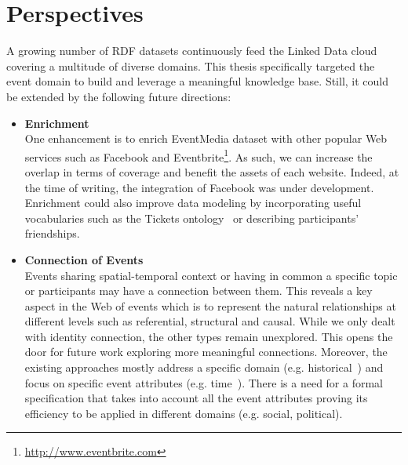\section{Perspectives}
A growing number of RDF datasets continuously feed the Linked Data cloud covering a multitude of diverse domains. This thesis specifically targeted the event domain to build and leverage a meaningful knowledge base. Still, it could be extended by the following future directions:

\begin{itemize}
\item \textbf{Enrichment}
\vspace{1mm}
\\One enhancement is to enrich EventMedia dataset with other popular Web services such as Facebook and Eventbrite\footnote{\url{http://www.eventbrite.com}}. As such, we can increase the overlap in terms of coverage and benefit the assets of each website. Indeed, at the time of writing, the integration of Facebook was under development. Enrichment could also improve data modeling by incorporating useful vocabularies such as the Tickets ontology~\cite{Hepp:2010} or describing participants' friendships. 


\item \textbf{Connection of Events}
\vspace{1mm}
\\ Events sharing spatial-temporal context or having in common a specific topic or participants may have a connection between them. This reveals a key aspect in the Web of events which is to represent the natural relationships at different levels such as referential, structural and causal. While we only dealt with identity connection, the other types remain unexplored. This opens the door for future work exploring more meaningful connections. Moreover, the existing approaches mostly address a specific domain (e.g. historical~\cite{Corda:IESD12}) and focus on specific event attributes (e.g. time~\cite{Vikramaditya:ICTA07}). There is a need for a formal specification that takes into account all the event attributes proving its efficiency to be applied in different domains (e.g. social, political). 


\end{itemize}
